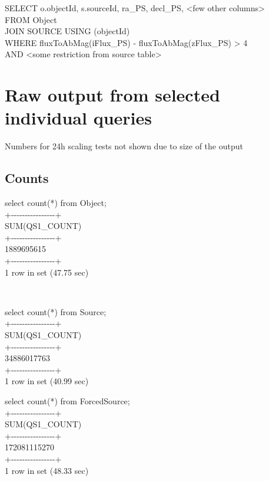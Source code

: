 \documentclass[DM,toc]{lsstdoc}
\begin{document}
SELECT o.objectId, s.sourceId, ra\_PS, decl\_PS, \textless{}few other
columns\textgreater{}\\
FROM Object\\
JOIN SOURCE USING (objectId)\\
WHERE fluxToAbMag(iFlux\_PS) - fluxToAbMag(zFlux\_PS) \textgreater{} 4\\
AND \textless{}some restriction from source table\textgreater{}~

\section{Raw output from selected individual
queries}\label{raw-output-from-selected-individual-queries}

Numbers for 24h scaling tests not shown due to size of the output

\subsection{Counts}\label{counts}

select count(*) from Object;\\
+-\/-\/-\/-\/-\/-\/-\/-\/-\/-\/-\/-\/-\/-\/-\/-+\\
\textbar{} SUM(QS1\_COUNT) \textbar{}\\
+-\/-\/-\/-\/-\/-\/-\/-\/-\/-\/-\/-\/-\/-\/-\/-+\\
\textbar{} 1889695615 \textbar{}\\
+-\/-\/-\/-\/-\/-\/-\/-\/-\/-\/-\/-\/-\/-\/-\/-+\\
1 row in set (47.75 sec)

~

select count(*) from Source;\\
+-\/-\/-\/-\/-\/-\/-\/-\/-\/-\/-\/-\/-\/-\/-\/-+\\
\textbar{} SUM(QS1\_COUNT) \textbar{}\\
+-\/-\/-\/-\/-\/-\/-\/-\/-\/-\/-\/-\/-\/-\/-\/-+\\
\textbar{} 34886017763 \textbar{}\\
+-\/-\/-\/-\/-\/-\/-\/-\/-\/-\/-\/-\/-\/-\/-\/-+\\
1 row in set (40.99 sec)

select count(*) from ForcedSource;\\
+-\/-\/-\/-\/-\/-\/-\/-\/-\/-\/-\/-\/-\/-\/-\/-+\\
\textbar{} SUM(QS1\_COUNT) \textbar{}\\
+-\/-\/-\/-\/-\/-\/-\/-\/-\/-\/-\/-\/-\/-\/-\/-+\\
\textbar{} 172081115270 \textbar{}\\
+-\/-\/-\/-\/-\/-\/-\/-\/-\/-\/-\/-\/-\/-\/-\/-+\\
1 row in set (48.33 sec)
\end{document}
